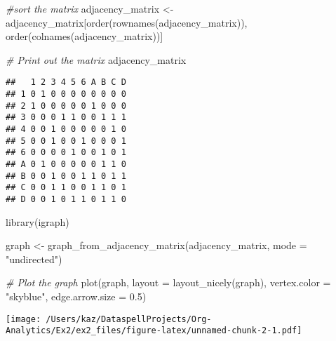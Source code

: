 \documentclass[
]{article}
\newenvironment{Shaded}{\begin{snugshade}}{\end{snugshade}}
\newcommand{\AttributeTok}[1]{\textcolor[rgb]{0.77,0.63,0.00}{#1}}
\newcommand{\CommentTok}[1]{\textcolor[rgb]{0.56,0.35,0.01}{\textit{#1}}}
\newcommand{\FloatTok}[1]{\textcolor[rgb]{0.00,0.00,0.81}{#1}}
\newcommand{\FunctionTok}[1]{\textcolor[rgb]{0.00,0.00,0.00}{#1}}
\newcommand{\NormalTok}[1]{#1}
\newcommand{\OtherTok}[1]{\textcolor[rgb]{0.56,0.35,0.01}{#1}}
\newcommand{\StringTok}[1]{\textcolor[rgb]{0.31,0.60,0.02}{#1}}
\begin{document}
\begin{Shaded}
\begin{Highlighting}[]
\CommentTok{\#sort the matrix}
\NormalTok{adjacency\_matrix }\OtherTok{\textless{}{-}}\NormalTok{ adjacency\_matrix[}\FunctionTok{order}\NormalTok{(}\FunctionTok{rownames}\NormalTok{(adjacency\_matrix)), }\FunctionTok{order}\NormalTok{(}\FunctionTok{colnames}\NormalTok{(adjacency\_matrix))]}

\CommentTok{\# Print out the matrix}
\NormalTok{adjacency\_matrix}
\end{Highlighting}
\end{Shaded}

\begin{verbatim}
##   1 2 3 4 5 6 A B C D
## 1 0 1 0 0 0 0 0 0 0 0
## 2 1 0 0 0 0 0 1 0 0 0
## 3 0 0 0 1 1 0 0 1 1 1
## 4 0 0 1 0 0 0 0 0 1 0
## 5 0 0 1 0 0 1 0 0 0 1
## 6 0 0 0 0 1 0 0 1 0 1
## A 0 1 0 0 0 0 0 1 1 0
## B 0 0 1 0 0 1 1 0 1 1
## C 0 0 1 1 0 0 1 1 0 1
## D 0 0 1 0 1 1 0 1 1 0
\end{verbatim}

\begin{Shaded}
\begin{Highlighting}[]
\FunctionTok{library}\NormalTok{(igraph)}

\NormalTok{graph }\OtherTok{\textless{}{-}} \FunctionTok{graph\_from\_adjacency\_matrix}\NormalTok{(adjacency\_matrix, }\AttributeTok{mode =} \StringTok{"undirected"}\NormalTok{)}

\CommentTok{\# Plot the graph}
\FunctionTok{plot}\NormalTok{(graph, }\AttributeTok{layout =} \FunctionTok{layout\_nicely}\NormalTok{(graph), }\AttributeTok{vertex.color =} \StringTok{"skyblue"}\NormalTok{, }\AttributeTok{edge.arrow.size =} \FloatTok{0.5}\NormalTok{)}
\end{Highlighting}
\end{Shaded}

\texttt{[image: /Users/kaz/DataspellProjects/Org-Analytics/Ex2/ex2\_files/figure-latex/unnamed-chunk-2-1.pdf]}
\end{document}
